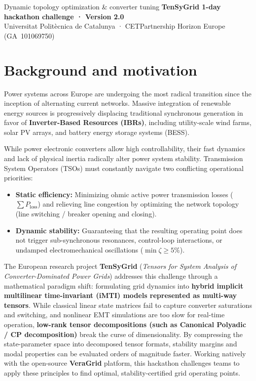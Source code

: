 \documentclass[11pt,a4paper]{article}
\begin{document}
{Dynamic topology optimization \& converter tuning}
{\textbf{TenSyGrid 1-day hackathon challenge · Version 2.0}\\[1pt]
{\footnotesize Universitat Politècnica de Catalunya · CETPartnership Horizon Europe \mbox{(GA 101069750)}}}

\section{Background and motivation}

Power systems across Europe are undergoing the most radical transition since the inception of alternating current networks. Massive integration of renewable energy sources is progressively displacing traditional synchronous generation in favor of \textbf{Inverter-Based Resources (IBRs)}, including utility-scale wind farms, solar PV arrays, and battery energy storage systems (BESS).

While power electronic converters allow high controllability, their fast dynamics and lack of physical inertia radically alter power system stability. Transmission System Operators (TSOs) must constantly navigate two conflicting operational priorities:
\begin{itemize}[leftmargin=*, itemsep=2pt]
  \item \textbf{Static efficiency:} Minimizing ohmic active power transmission losses ($\sum P_{\text{loss}}$) and relieving line congestion by optimizing the network topology (line switching / breaker opening and closing).
  \item \textbf{Dynamic stability:} Guaranteeing that the resulting operating point does not trigger sub-synchronous resonances, control-loop interactions, or undamped electromechanical oscillations ($\min \zeta \ge 5\%$).
\end{itemize}

The European research project \textbf{TenSyGrid} (\textit{Tensors for System Analysis of Converter-Dominated Power Grids}) addresses this challenge through a mathematical paradigm shift: formulating grid dynamics into \textbf{hybrid implicit multilinear time-invariant (iMTI) models represented as multi-way tensors}. While classical linear state matrices fail to capture converter saturations and switching, and nonlinear EMT simulations are too slow for real-time operation, \textbf{low-rank tensor decompositions (such as Canonical Polyadic / CP decomposition)} break the curse of dimensionality. By compressing the state-parameter space into decomposed tensor formats, stability margins and modal properties can be evaluated orders of magnitude faster. Working natively with the open-source \textbf{VeraGrid} platform, this hackathon challenges teams to apply these principles to find optimal, stability-certified grid operating points.
\end{document}
